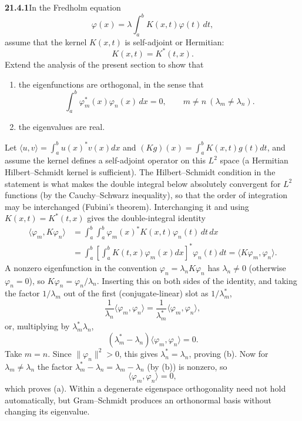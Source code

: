 \par\bigskip
\noindent\textbf{21.4.1}\quad In the Fredholm equation
\[
\varphi(x)=\lambda\int_{a}^{b}K(x,t)\varphi(t)\,dt,
\]
assume that the kernel $K(x,t)$ is self-adjoint or Hermitian:
\[
K(x,t)=K^{*}(t,x).
\]
Extend the analysis of the present section to show that
\begin{enumerate}
\item[(a)] the eigenfunctions are orthogonal, in the sense that
\[
\int_{a}^{b}\varphi_{m}^{*}(x)\varphi_{n}(x)\,dx=0,
\qquad m\ne n\ (\lambda_{m}\ne\lambda_{n}).
\]
\item[(b)] the eigenvalues are real.
\end{enumerate}
\solution
Let $\langle u,v\rangle=\int_a^b u(x)^*v(x)dx$ and
$(Kg)(x)=\int_a^bK(x,t)g(t)dt$, and assume the
kernel defines a self-adjoint operator on this $L^2$ space (a Hermitian
Hilbert--Schmidt kernel is sufficient). The Hilbert--Schmidt condition
in the statement is what makes the double integral below absolutely
convergent for $L^2$ functions (by the Cauchy--Schwarz inequality), so
that the order of integration may be interchanged (Fubini's theorem).
Interchanging it and using $K(x,t)=K^*(t,x)$ gives the
double-integral identity
\[
\begin{aligned}
\langle\varphi_m,K\varphi_n\rangle
&=\int_a^b\!\!\int_a^b
\varphi_m(x)^*K(x,t)\varphi_n(t)\,dt\,dx\\
&=\int_a^b\left[\int_a^bK(t,x)\varphi_m(x)dx\right]^*
\varphi_n(t)dt
=\langle K\varphi_m,\varphi_n\rangle.
\end{aligned}
\]
A nonzero eigenfunction in the convention
$\varphi_n=\lambda_nK\varphi_n$ has $\lambda_n\ne0$ (otherwise
$\varphi_n=0$), so $K\varphi_n=\varphi_n/\lambda_n$. Inserting this on
both sides of the identity, and taking the factor $1/\lambda_m$ out of
the first (conjugate-linear) slot as $1/\lambda_m^*$,
\[
\frac1{\lambda_n}\langle\varphi_m,\varphi_n\rangle
=\frac1{\lambda_m^*}\langle\varphi_m,\varphi_n\rangle,
\]
or, multiplying by $\lambda_m^*\lambda_n$,
\[
(\lambda_m^*-\lambda_n)
\langle\varphi_m,\varphi_n\rangle=0.
\]
Take $m=n$. Since $\|\varphi_n\|^2>0$, this gives
$\boxed{\lambda_n^*=\lambda_n}$, proving (b).
Now for $\lambda_m\ne\lambda_n$ the factor
$\lambda_m^*-\lambda_n=\lambda_m-\lambda_n$ (by (b)) is nonzero, so
\[
\boxed{\langle\varphi_m,\varphi_n\rangle=0},
\]
which proves (a). Within a degenerate eigenspace orthogonality need
not hold automatically, but Gram--Schmidt produces an orthonormal
basis without changing its eigenvalue.


